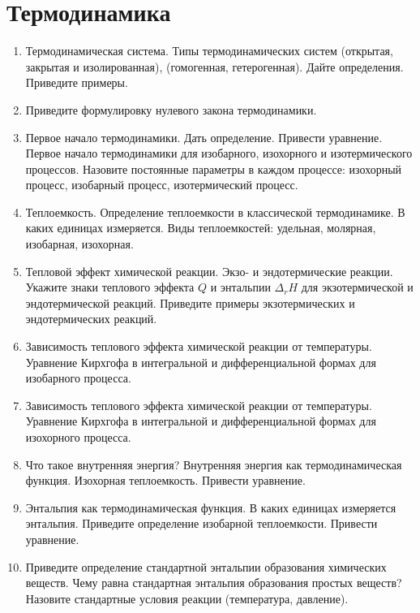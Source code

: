 \section{Термодинамика}
\begin{enumerate}
\item 
Термодинамическая система. Типы термодинамических систем (открытая, закрытая и изолированная), (гомогенная, гетерогенная). Дайте определения. Приведите примеры.
 
\item 
Приведите формулировку нулевого закона термодинамики.
 
\item 
Первое начало термодинамики. Дать определение. Привести уравнение. Первое начало термодинамики для изобарного, изохорного и изотермического процессов. Назовите постоянные параметры в каждом процессе: изохорный процесс, изобарный процесс, изотермический процесс.
 
\item 
Теплоемкость. Определение теплоемкости в классической термодинамике. В каких единицах измеряется. Виды теплоемкостей: удельная, молярная, изобарная, изохорная.
 
\item 
Тепловой эффект химической реакции. Экзо- и эндотермические реакции. Укажите знаки теплового эффекта $Q$ и энтальпии  $\Delta_{r}H$ для экзотермической  и эндотермической реакций. Приведите примеры экзотермических и эндотермических реакций.
 
\item 
Зависимость теплового эффекта химической реакции от температуры. Уравнение Кирхгофа в интегральной и дифференциальной формах для изобарного процесса.
 
\item 
Зависимость теплового эффекта химической реакции от температуры. Уравнение Кирхгофа в интегральной и дифференциальной формах для изохорного процесса.
 
\item 
Что такое внутренняя энергия? Внутренняя энергия как термодинамическая функция. Изохорная теплоемкость. Привести уравнение.
 
\item 
Энтальпия как термодинамическая функция. В каких единицах измеряется энтальпия. Приведите определение изобарной теплоемкости. Привести уравнение.
 
\item 
Приведите определение стандартной энтальпии образования химических веществ. Чему равна стандартная энтальпия образования простых веществ? Назовите стандартные условия реакции (температура, давление).
 

\end{enumerate}
